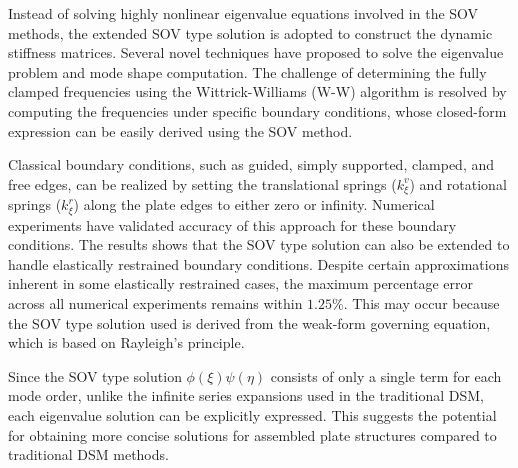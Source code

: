 \documentclass[preprint,12pt]{elsarticle}
\begin{document}
Instead of solving highly nonlinear eigenvalue equations involved in the SOV methods, the extended SOV type solution is adopted to construct the dynamic stiffness matrices.
Several novel techniques have proposed to solve the eigenvalue problem and mode shape computation.
The challenge of determining the fully clamped frequencies using the Wittrick-Williams (W-W) algorithm is resolved by computing the frequencies under specific boundary conditions, whose closed-form expression can be easily derived using the SOV method.  

Classical boundary conditions, such as guided, simply supported, clamped, and free edges, can be realized by setting the translational springs ($k^v_\xi$) and rotational springs ($k^r_\xi$) along the plate edges to either zero or infinity.  
Numerical experiments have validated accuracy of this approach for these boundary conditions.  
The results shows that the SOV type solution can also be extended to handle elastically restrained boundary conditions.
Despite certain approximations inherent in some elastically restrained cases, the maximum percentage error across all numerical experiments remains within $1.25\%$.  
This may occur because the SOV type solution used is derived from the weak-form governing equation, which is based on Rayleigh's principle.  

Since the SOV type solution $\phi(\xi) \psi(\eta)$ consists of only a single term for each mode order, unlike the infinite series expansions used in the traditional DSM, each eigenvalue solution can be explicitly expressed.  
This suggests the potential for obtaining more concise solutions for assembled plate structures compared to traditional DSM methods.  
\end{document}
